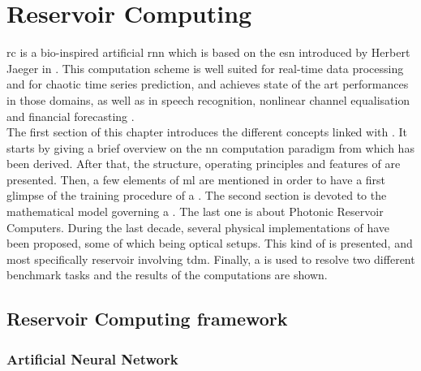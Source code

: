 \chapter{Reservoir Computing}
\label{rc}

\gls{rc} is a bio-inspired artificial \gls{rnn} which is based on the \gls{esn} introduced by Herbert Jaeger in \cite{Jaeger2004}. This computation scheme is well suited for real-time data processing and for chaotic time series prediction\cite{Jaeger2004, JaegerH.2001Tesa, Lukoeviius2012}, and achieves state of the art performances in those domains, as well as in speech recognition\cite{Verstraeten2006, NIPS2010_4056, Jaeger2007}, nonlinear channel equalisation\cite{Jaeger2004} and financial forecasting \cite{financialTimeSeries}.\\

The first section of this chapter introduces the different concepts linked with \rc. It starts by giving a brief overview on the \gls{nn} computation paradigm from which \rc has been derived. After that, the structure, operating principles and features of \rcer are presented. Then, a few elements of \gls{ml} are mentioned in order to have a first glimpse of the training procedure of a \rcer. The second section is devoted to the mathematical model governing a \rcer. The last one is about Photonic Reservoir Computers. During the last decade, several physical implementations of \rcer have been proposed, some of which being optical setups. This kind of \rcer is presented, and most specifically reservoir involving \gls{tdm}. Finally, a \rcer is used to resolve two different benchmark tasks and the results of the computations are shown.

\section{Reservoir Computing framework}


\subsection{Artificial Neural Network}

